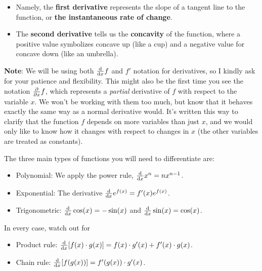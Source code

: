 \begin{itemize}
	\item Namely, the \textbf{first derivative} represents the slope of a tangent line to the function, or \textbf{the instantaneous rate of change}.
	
	\item The \textbf{second derivative} tells us the \textbf{concavity} of the function, where a positive value symbolizes concave up (like a cup) and a negative value for concave down (like an umbrella).	
\end{itemize} 

\textbf{Note}: We will be using both $\dv{x} f$ and $f'$ notation for derivatives, so I kindly ask for your patience and flexibility. 
This might also be the first time you see the notation $\pdv{x} f$, which represents a \emph{partial} derivative of $f$ with respect to the variable $x$. 
We won't be working with them too much, but know that it behaves exactly the same way as a normal derivative would. 
It's written this way to clarify that the function $f$ depends on more variables than just $x$, and we would only like to know how it changes with respect to changes in $x$ (the other variables are treated as constants). 

The three main types of functions you will need to differentiate are:

\begin{itemize}
	\item Polynomial: We apply the power rule, $\dv{x} x^n = nx^{n-1}$.
	
	\item Exponential: The derivative $ \dv{x} e^{f(x)} = f'(x)e^{f(x)}$.
	
	\item Trigonometric: $\dv{x} \cos(x) = -\sin(x)$ and $\dv{x} \sin(x) = \cos(x)$. 
\end{itemize}

In every case, watch out for 

\begin{itemize}
	\item Product rule: $\dv{x} [f(x)\cdot g(x)] = f(x)\cdot g'(x) + f'(x)\cdot g(x)$.
	
	\item Chain rule: $\dv{x} [f(g(x))] = f'(g(x)) \cdot g'(x)$.
\end{itemize}



